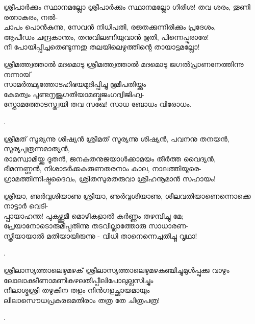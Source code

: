 \begin{enumerate}

\begin{slokam}{\VSr}{\SVL}{ശ്രീപാർക്കും സ്ഥാനമല്ലോ}
ശ്രീപാർക്കും സ്ഥാനമല്ലോ ഗിരിശ! തവ ശരം, തൂണി രത്നാകരം, നൽ-\\
ചാപം പൊൻകുന്നു, സേവൻ നിധിപതി, രജതക്കുന്നിരിക്കും പ്രദേശം,\\
ആപീഡം ചന്ദ്രകാന്തം, തനുവിലണിയുവാൻ ഭൂതി, പിന്നെപ്പുരാരേ!\\
നീ പോയിപ്പിച്ചതെണ്ടുന്നതു തലയിലെഴുത്തിന്റെ തായാട്ടമല്ലോ!
\end{slokam}


\begin{slokam}{\VMk}{\KV}{ശ്രീമത്ത്വത്താൽ മദമൊടു}
ശ്രീമത്ത്വത്താൽ മദമൊടു ജഗൽപ്രാണനേത്തിന്നു നന്നായ്\\
സാമർത്ഥ്യത്തോടഹിഭയമുദിപ്പിച്ചു ഭൂമീപതിയ്ക്കും\\
കേമത്വം പൂണ്ടനൃജൂഗതിയാമബ്ഭുജംഗദ്വിജിഹ്വ-\\
സ്തോമത്തോടസ്ത്വയി തവ സഖേ! സാധ ബോധം വിരോധം.
\end{slokam}


.


\begin{slokam}{\VSr}{\VNM}{ശ്രീമത്‌ സൂര്യന്നു ശിഷ്യൻ}
ശ്രീമത്‌ സൂര്യന്നു ശിഷ്യൻ, പവനനു തനയൻ, സൂര്യപുത്രന്നമാത്യൻ,\\
രാമസ്വാമിയ്ക്കു ദൂതൻ, ജനകതനുജയാള്‍ക്കാമയം തീർത്ത വൈദ്യൻ,\\
ഭീമന്നണ്ണൻ, നിശാടർക്കകരുണതരനാം കാല, നാലത്തിയൂരെ-\\
ഗ്രാമത്തിന്നിഷ്ടദൈവം, ശ്രിതസുരതരുവാ ശ്രീഹനൂമാൻ സഹായം!
\end{slokam}


\begin{slokam}{\VSv}{\VNM}{ശ്രീയാ, ണുർവ്വശിയാണു}
 ശ്രീയാ, ണുർവ്വശിയാണു, ശീലവതിയാണെന്നൊക്കെ നാട്ടാർ വെടി-\\
പ്പായാഹന്ത! പുകഴ്ത്തുമീ മൊഴികളാൽ കർണ്ണം തഴമ്പിച്ചു മേ;\\
പ്രേയാനോടൊരുമിപ്പതിന്നു തടവില്ലാത്തോരു സാധാരണ-\\
സ്ത്രീയായാൽ മതിയായിരുന്നു - വിധി താനെന്നെച്ചതിച്ചൂ വൃഥാ!
\end{slokam}


.

\begin{slokam}{\VMk}{\KV}{ശ്രീലാസ്യത്താലെഴുമഴക്}
ശ്രീലാസ്യത്താലെഴുമഴകുഞ്ചിച്ചുമുൾപ്പുക്കു വാഴും\\
ലോലാക്ഷീണാമണികുഴലതിപ്പീലിപോലുല്ലസിച്ചും\\
നീലാശ്മശ്രീ തഴുകിന തളം നിൻഗളച്ഛായമായും\\
ലീലാസൌധപ്രകരമെതിരാം തത്ര തേ ചിത്രപത്ര!
\end{slokam}


.


\end{enumerate}

